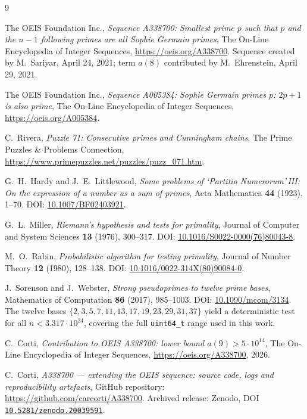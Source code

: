 \documentclass[11pt,a4paper]{article}
\theoremstyle{definition}
\begin{document}
\begin{thebibliography}{9}

The OEIS Foundation Inc.,
\emph{Sequence A338700: Smallest prime $p$ such that $p$ and the $n-1$
following primes are all Sophie Germain primes},
The On-Line Encyclopedia of Integer Sequences,
\url{https://oeis.org/A338700}.
Sequence created by M.\ Sariyar, April 24, 2021; term $a(8)$
contributed by M.\ Ehrenstein, April 29, 2021.

The OEIS Foundation Inc.,
\emph{Sequence A005384: Sophie Germain primes $p$: $2p+1$ is also prime},
The On-Line Encyclopedia of Integer Sequences,
\url{https://oeis.org/A005384}.

C.\ Rivera,
\emph{Puzzle 71: Consecutive primes and Cunningham chains},
The Prime Puzzles \& Problems Connection,
\url{https://www.primepuzzles.net/puzzles/puzz_071.htm}.

G.~H.\ Hardy and J.~E.\ Littlewood,
\emph{Some problems of `Partitio Numerorum'\,III: On the expression of a
number as a sum of primes},
Acta Mathematica \textbf{44} (1923), 1–70.
DOI: \href{https://doi.org/10.1007/BF02403921}{10.1007/BF02403921}.

G.~L.\ Miller,
\emph{Riemann's hypothesis and tests for primality},
Journal of Computer and System Sciences \textbf{13} (1976), 300–317.
DOI: \href{https://doi.org/10.1016/S0022-0000(76)80043-8}{10.1016/S0022-0000(76)80043-8}.

M.~O.\ Rabin,
\emph{Probabilistic algorithm for testing primality},
Journal of Number Theory \textbf{12} (1980), 128–138.
DOI: \href{https://doi.org/10.1016/0022-314X(80)90084-0}{10.1016/0022-314X(80)90084-0}.

J.~Sorenson and J.~Webster,
\emph{Strong pseudoprimes to twelve prime bases},
Mathematics of Computation \textbf{86} (2017), 985–1003.
DOI: \href{https://doi.org/10.1090/mcom/3134}{10.1090/mcom/3134}.
The twelve bases $\{2,3,5,7,11,13,17,19,23,29,31,37\}$ yield a
deterministic test for all $n < 3.317\cdot 10^{24}$, covering the
full \texttt{uint64\_t} range used in this work.

C.\ Corti,
\emph{Contribution to OEIS A338700: lower bound $a(9) > 5\cdot 10^{14}$},
The On-Line Encyclopedia of Integer Sequences,
\url{https://oeis.org/A338700}, 2026.

C.\ Corti,
\emph{A338700 — extending the OEIS sequence: source code, logs and
reproducibility artefacts},
GitHub repository: \url{https://github.com/carcorti/A338700}.
Archived release: Zenodo, DOI \href{https://doi.org/10.5281/zenodo.20039591}{\texttt{10.5281/zenodo.20039591}}.

\end{thebibliography}
\end{document}
